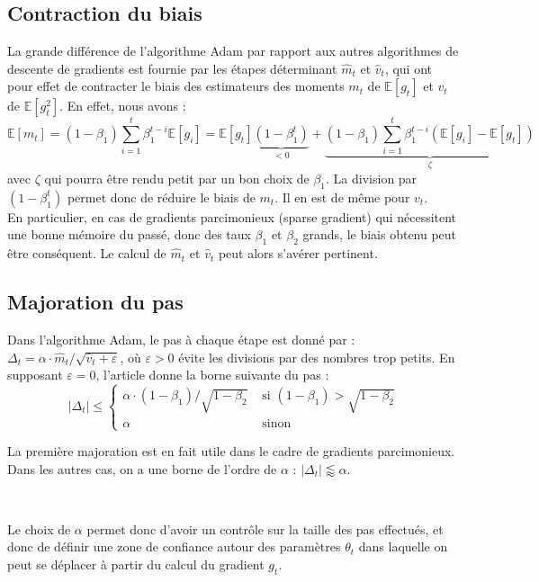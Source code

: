 \documentclass[11pt,a4paper, french]{article}
\newcommand{\dsum}[2]{\displaystyle\sum_{#1}^{#2}}
\begin{document}
\subsection{Contraction du biais}

La grande différence de l'algorithme Adam par rapport aux autres algorithmes de descente de gradients est fournie par les étapes déterminant $\widehat m_t$ et $\widehat v_t$, qui ont pour effet de contracter le biais des estimateurs des moments $m_t$ de $\mathbb E[g_t]$ et $v_t$ de $\mathbb E[g_t^2]$. En effet, nous avons :
$$\mathbb E[m_t]=(1-\beta_1)\dsum{i=1}t\beta_1^{t-i}\mathbb E[g_i]= \mathbb E[g_t]\underset{<0}{\underbrace{(1-\beta_1^t)}}+\underset{\zeta}{\underbrace{(1-\beta_1)\dsum{i=1}t\beta_1^{t-i}(\mathbb E[g_i]-\mathbb E[g_t])}}$$
avec $\zeta$ qui pourra être rendu petit par un bon choix de $\beta_1$. La division par $(1-\beta_1^t)$ permet donc de réduire le biais de $m_t$. Il en est de même pour $v_t$. \\

En particulier, en cas de gradients parcimonieux (sparse gradient) qui nécessitent une bonne mémoire du passé, donc des taux $\beta_1$ et $\beta_2$ grands, le biais obtenu peut être conséquent. Le calcul de $\widehat m_t$ et $\widehat v_t$ peut alors s'avérer pertinent.


\subsection{Majoration du pas}

Dans l'algorithme Adam, le pas à chaque étape est donné par : $\Delta_t=\alpha\cdotp \widehat m_t/\sqrt{\widehat v_t+\varepsilon}$, où $\varepsilon>0$ évite les divisions par des nombres trop petits. En supposant $\varepsilon=0$, l'article donne la borne suivante du pas : 
$$|\Delta_t|\leqslant \left\{\begin{array}{ll}
\alpha\cdotp (1-\beta_1)/\sqrt{1-\beta_2} & \text{ si }(1-\beta_1)>\sqrt{1-\beta_2}\\
\alpha & \text{ sinon}
\end{array}\right.
$$

La première majoration est en fait utile dans le cadre de gradients parcimonieux. Dans les autres cas, on a une borne de l'ordre de $\alpha$ : $|\Delta_t|\lessapprox \alpha$.

\

Le choix de $\alpha$ permet donc d'avoir un contrôle sur la taille des pas effectués, et donc de définir une \og zone de confiance\fg{} autour des paramètres $\theta_t$ dans laquelle on peut se déplacer à partir du calcul du gradient $g_t$.
\end{document}
